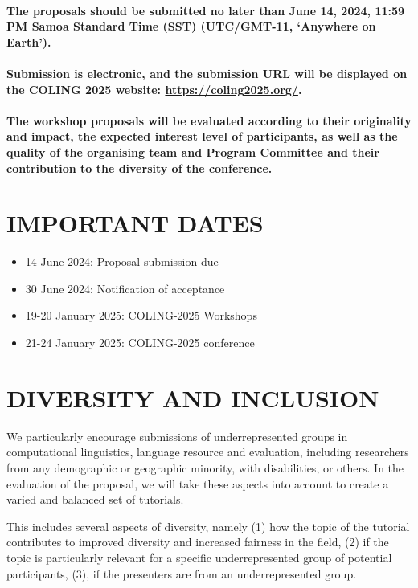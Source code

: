 \documentclass[11pt]{article}
\begin{document}
\paragraph{The proposals should be submitted no later than June 14, 2024, 11:59 PM Samoa Standard Time (SST) (UTC/GMT-11, ‘Anywhere on Earth’).}

\paragraph{Submission is electronic, and the submission URL will be displayed on the COLING 2025 website: \url{https://coling2025.org/}.}

\paragraph{The workshop proposals will be evaluated according to their originality and impact, the expected interest level of participants, as well as the quality of the organising team and Program Committee and their contribution to the diversity of the conference.}

\section{IMPORTANT DATES}
\begin{itemize}
    \item 14 June 2024: Proposal submission due
    \item 30 June 2024: Notification of acceptance
    \item 19-20 January 2025: COLING-2025 Workshops
    \item 21-24 January 2025: COLING-2025 conference
\end{itemize}

\section{DIVERSITY AND INCLUSION}
We particularly encourage submissions of underrepresented groups in computational linguistics, language resource and evaluation, including researchers from any demographic or geographic minority, with disabilities, or others. In the evaluation of the proposal, we will take these aspects into account to create a varied and balanced set of tutorials.

This includes several aspects of diversity, namely (1) how the topic of the tutorial contributes to improved diversity and increased fairness in the field, (2) if the topic is particularly relevant for a specific underrepresented group of potential participants, (3), if the presenters are from an underrepresented group.
\end{document}
